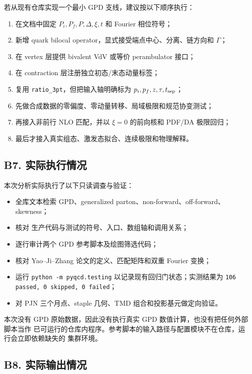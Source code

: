 \documentclass[UTF8]{ctexart}
\renewcommand{\path}[1]{\textsf{\detokenize{#1}}}
\begin{document}
若从现有仓库实现一个最小 GPD 支线，建议按以下顺序执行：

\begin{enumerate}
\item 在文档中固定 $P_i,P_f,P,\Delta,\xi,t$ 和 Fourier 相位符号；
\item 新增 quark bilocal operator，显式接受端点中心、分离、链方向和 $\Gamma$；
\item 在 vertex 层提供 bivalent VdV 或等价 perambulator 接口；
\item 在 contraction 层注册独立初态/末态动量标签；
\item 复用 \texttt{ratio\_3pt}，但把输入轴明确标为
$p_i,p_f,z,\tau,t_{\rm sep}$；
\item 先做合成数据的零偏度、零动量转移、局域极限和规范协变测试；
\item 再接入非前行 NLO 匹配，并以 $\xi=0$ 的前向核和 PDF/DA 极限回归；
\item 最后才接入真实组态、激发态拟合、连续极限和物理解释。
\end{enumerate}

\subsection{B7. 实际执行情况}

本次分析实际执行了以下只读调查与验证：

\begin{itemize}
\item 全库文本检索 GPD、generalized parton、non-forward、off-forward、skewness；
\item 核对 \path{pyqcd} 生产代码与测试的符号、入口、数组轴和调用关系；
\item 逐行审计两个 GPD 参考脚本及绘图筛选代码；
\item 核对 Yao--Ji--Zhang 论文的定义、匹配矩阵和双重 Fourier 变换；
\item 运行 \texttt{python -m pyqcd.testing} 以记录现有回归门状态；实测结果为
\texttt{106 passed, 0 skipped, 0 failed}；
\item 对 PJN 三个月点、staple 几何、TMD 组合和投影基元做定向验证。
\end{itemize}

本次没有 GPD 原始数据，因此没有执行真实 GPD 数值计算，也没有把任何外部脚本当作
已可运行的仓库内程序。参考脚本的输入路径与配置模块不在仓库，运行会立即依赖缺失的
集群环境。 \cite{R1}

\subsection{B8. 实际输出情况}
\end{document}
